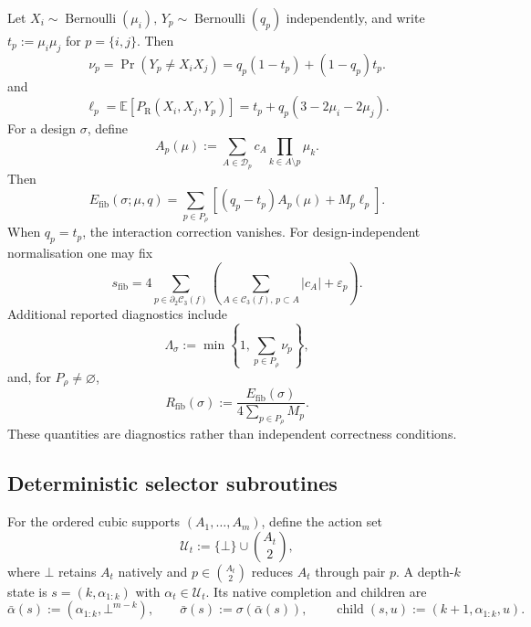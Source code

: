 \documentclass[a4paper,onecolumn,11pt,unpublished]{quantumarticle}
\theoremstyle{remark}
\begin{document}
Let
\(
X_i\sim\operatorname{Bernoulli}(\mu_i),
\,
Y_p\sim\operatorname{Bernoulli}(q_p)
\)
independently, and write $t_p:=\mu_i\mu_j$ for $p=\{i,j\}$.
Then
\begin{equation}
\nu_p
=
\Pr(Y_p\neq X_iX_j)
=
q_p(1-t_p)+(1-q_p)t_p.
\label{eq:fibre-violation-probability}
\end{equation}
and
\[
\ell_p
=
\mathbb E[P_{\mathrm R}(X_i,X_j,Y_p)]
=
t_p+q_p(3-2\mu_i-2\mu_j).
\]
For a design $\sigma$, define
\[
A_p(\mu)
:=
\sum_{A\in\mathcal D_p} c_A
\prod_{k\in A\setminus p}\mu_k.
\]
Then
\begin{equation}
E_{\mathrm{fib}}(\sigma;\mu,q)
=
\sum_{p\in P_\rho}
\left[
(q_p-t_p)A_p(\mu)+M_p\ell_p
\right].
\label{eq:fibre-excess-full}
\end{equation}
When $q_p=t_p$, the interaction correction vanishes.
For design-independent normalisation one may fix
\[
s_{\mathrm{fib}}
=
4\sum_{p\in\partial_2\mathcal C_3(f)}
\left(
\sum_{A\in\mathcal C_3(f),\,p\subset A}|c_A|
+\varepsilon_p
\right).
\]
Additional reported diagnostics include
\[
\Lambda_\sigma
:=
\min\left\{1,\sum_{p\in P_\rho}\nu_p\right\},
\]
and, for $P_\rho\neq\varnothing$,
\[
R_{\mathrm{fib}}(\sigma)
:=
\frac{E_{\mathrm{fib}}(\sigma)}
{4\sum_{p\in P_\rho}M_p}.
\]
These quantities are diagnostics rather than independent correctness
conditions.

\subsection{Deterministic selector subroutines}
\label{app:selector-details}

For the ordered cubic supports $(A_1,\ldots,A_m)$, define the action set
\begin{equation}
\mathcal U_t:=\{\bot\}\cup\binom{A_t}{2},
\label{eq:app-action-set}
\end{equation}
where $\bot$ retains $A_t$ natively and $p\in\binom{A_t}{2}$ reduces $A_t$ through
pair $p$.  A depth-$k$ state is $s=(k,\alpha_{1:k})$ with
$\alpha_t\in\mathcal U_t$.  Its native completion and children are
\begin{equation}
\bar\alpha(s):=(\alpha_{1:k},\bot^{m-k}),
\qquad
\bar\sigma(s):=\sigma(\bar\alpha(s)),
\qquad
\operatorname{child}(s,u):=(k+1,\alpha_{1:k},u).
\label{eq:app-state-completion}
\end{equation}
\end{document}
